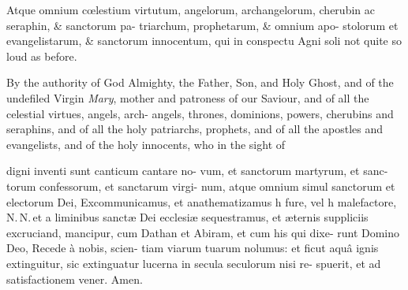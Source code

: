 \documentclass{article}
\begin{document}
\null\vfill
\quad\tsh Atque omnium cœlestium\break
virtutum, angelorum, archangelorum,\break
{}\break
cherubin ac seraphin, \& sanctorum pa-\break
triarchum, prophetarum, \& omnium apo-\break
stolorum et evangelistarum, \& sanctorum\break
innocentum, qui in conspectu Agni soli
not quite so loud as before.

\lqq By the authority of God Almighty,\break
\lqq the Father, Son, and Holy Ghost, and\break
\lqq of the undefiled Virgin \textit{Mary}, mother
\lqq and patroness of our Saviour, and of\break
\lqq all the celestial virtues, angels, arch-\break
\lqq angels, thrones, dominions, powers,\break
\lqq cherubins and seraphins, and of all the\break
\lqq holy patriarchs, prophets, and of all\break
\lqq the apostles and evangelists, and of the\break
\lqq holy innocents, who in the sight of

\noindent
digni inventi sunt canticum cantare no-\break
vum, et sanctorum martyrum, et sanc-\break
torum confessorum, et sanctarum virgi-\break
num, atque omnium simul sanctorum et\break
electorum Dei, \tsh Excommunicamus, et\break
anathematizamus h
fure, vel h\break
malefactore, N.\,N.\,et a liminibus sanctæ\break
Dei ecclesiæ sequestramus, et æternis\break
suppliciis excruciand,
mancipur, cum\break
Dathan et Abiram, et cum his qui dixe-\break
runt Domino Deo, Recede à nobis, scien-\break
tiam viarum tuarum nolumus: et ficut\break
aquâ ignis extinguitur, sic extinguatur\break
lucerna  in secula seculorum nisi re-\break
spuerit, et ad satisfactionem vener.\break
Amen.

\end{document}
